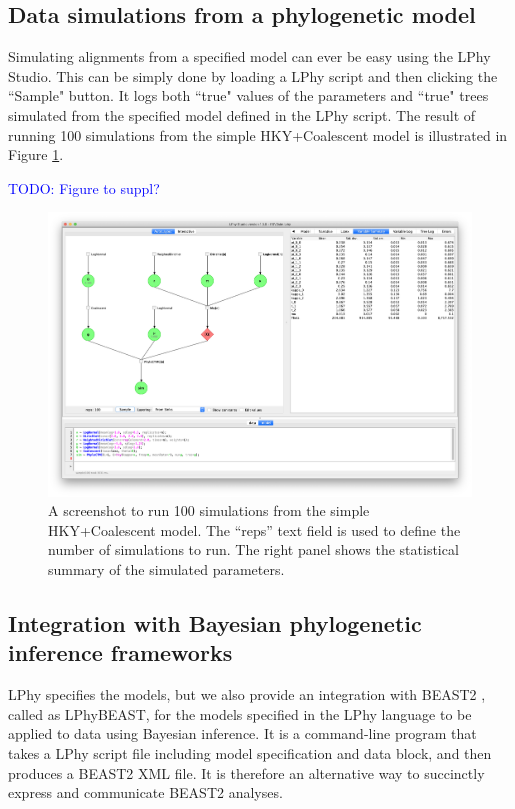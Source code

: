 \documentclass[10pt,letterpaper,table]{article}
\begin{document}
{\subsection{Data simulations from a phylogenetic model}
Simulating alignments from a specified model can ever be easy using the LPhy Studio. This can be simply done by loading a LPhy script and then clicking the ``Sample" button. 
It logs both ``true" values of the parameters and ``true" trees simulated from the specified model defined in the LPhy script. 
The result of running 100 simulations from the simple HKY+Coalescent model is illustrated in Figure \ref{fig:simulations100}. 

\textcolor{blue}{TODO: Figure to suppl?}

\begin{figure}
  \includegraphics[width=\textwidth]{figs/simulations100.png}
  \caption{A screenshot to run 100 simulations from the simple HKY+Coalescent model. The ``reps'' text field is used to define the number of simulations to run. The right panel shows the statistical summary of the simulated parameters.} 
  \label{fig:simulations100}
\end{figure}


\subsection{Integration with Bayesian phylogenetic inference frameworks}
LPhy specifies the models, but we also provide an integration with BEAST2 \cite{bouckaert2014beastanalysis,bouckaert2019beastanalysis}, called as LPhyBEAST, for the models specified in the LPhy language to be applied to data using Bayesian inference.
It is a command-line program that takes a LPhy script file including model specification and data block, and then produces a BEAST2 XML file. 
It is therefore an alternative way to succinctly express and communicate BEAST2 analyses.

}
\end{document}
